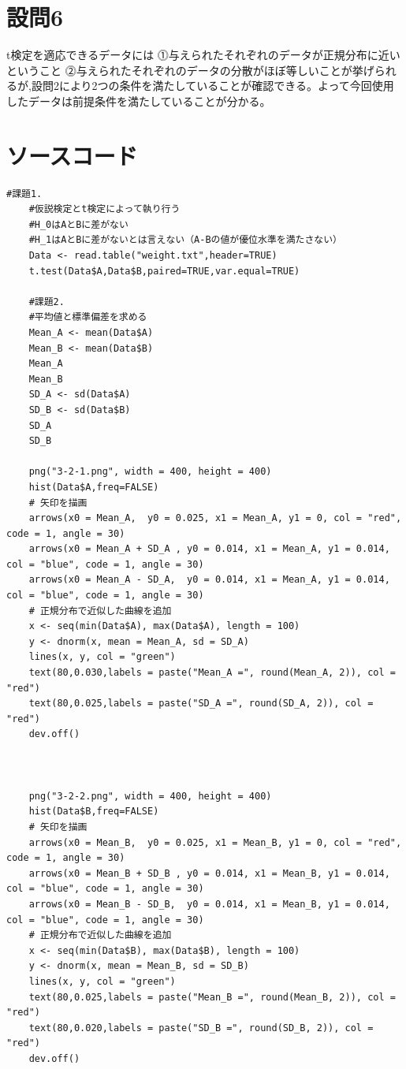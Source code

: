 \documentclass[fontsize = 10pt, paper= a4,twocolumn,column_gap=5zw]{jlreq}
\begin{document}
\section{設問6}
t検定を適応できるデータには
⓵与えられたそれぞれのデータが正規分布に近いということ
⓶与えられたそれぞれのデータの分散がほぼ等しいことが挙げられるが,設問2により2つの条件を満たしていることが確認できる。よって今回使用したデータは前提条件を満たしていることが分かる。

\section{ソースコード}
\begin{lstlisting}[basicstyle=\ttfamily\footnotesize, frame=single, caption=s2212022-1.c ,label=s2212022-1.c]
    #課題1.
    #仮説検定とt検定によって執り行う
    #H_0はAとBに差がない
    #H_1はAとBに差がないとは言えない（A-Bの値が優位水準を満たさない）
    Data <- read.table("weight.txt",header=TRUE)
    t.test(Data$A,Data$B,paired=TRUE,var.equal=TRUE)

    #課題2.
    #平均値と標準偏差を求める
    Mean_A <- mean(Data$A)
    Mean_B <- mean(Data$B)
    Mean_A 
    Mean_B
    SD_A <- sd(Data$A)
    SD_B <- sd(Data$B)
    SD_A
    SD_B

    png("3-2-1.png", width = 400, height = 400)
    hist(Data$A,freq=FALSE)
    # 矢印を描画
    arrows(x0 = Mean_A,  y0 = 0.025, x1 = Mean_A, y1 = 0, col = "red", code = 1, angle = 30)
    arrows(x0 = Mean_A + SD_A , y0 = 0.014, x1 = Mean_A, y1 = 0.014, col = "blue", code = 1, angle = 30)
    arrows(x0 = Mean_A - SD_A,  y0 = 0.014, x1 = Mean_A, y1 = 0.014, col = "blue", code = 1, angle = 30)
    # 正規分布で近似した曲線を追加
    x <- seq(min(Data$A), max(Data$A), length = 100)
    y <- dnorm(x, mean = Mean_A, sd = SD_A)
    lines(x, y, col = "green")
    text(80,0.030,labels = paste("Mean_A =", round(Mean_A, 2)), col = "red")
    text(80,0.025,labels = paste("SD_A =", round(SD_A, 2)), col = "red")
    dev.off()



    png("3-2-2.png", width = 400, height = 400)
    hist(Data$B,freq=FALSE)
    # 矢印を描画
    arrows(x0 = Mean_B,  y0 = 0.025, x1 = Mean_B, y1 = 0, col = "red", code = 1, angle = 30)
    arrows(x0 = Mean_B + SD_B , y0 = 0.014, x1 = Mean_B, y1 = 0.014, col = "blue", code = 1, angle = 30)
    arrows(x0 = Mean_B - SD_B,  y0 = 0.014, x1 = Mean_B, y1 = 0.014, col = "blue", code = 1, angle = 30)
    # 正規分布で近似した曲線を追加
    x <- seq(min(Data$B), max(Data$B), length = 100)
    y <- dnorm(x, mean = Mean_B, sd = SD_B)
    lines(x, y, col = "green")
    text(80,0.025,labels = paste("Mean_B =", round(Mean_B, 2)), col = "red")
    text(80,0.020,labels = paste("SD_B =", round(SD_B, 2)), col = "red")
    dev.off()



\end{lstlisting}
\end{document}
